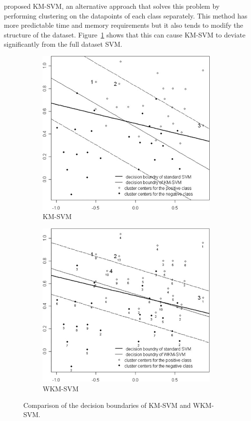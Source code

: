 \citet{Lee2007} proposed KM-SVM, an alternative approach that solves this problem by performing clustering on the datapoints of each class separately.
This method has more predictable time and memory requirements but it also tends to modify the structure of the dataset.
Figure~\ref{fig:wkmsvm:compare:km} shows that this can cause KM-SVM to deviate significantly from the full dataset SVM.\
\begin{figure}
	\begin{subfigure}{0.5\textwidth}
		\centering
		\includegraphics[width=0.85\linewidth]{gfx/wkmsvm/km.png}
		\caption{KM-SVM}\label{fig:wkmsvm:compare:km}
	\end{subfigure}
	\begin{subfigure}{0.5\textwidth}
		\centering
		\includegraphics[width=0.85\linewidth]{gfx/wkmsvm/wkm.png}
		\caption{WKM-SVM}\label{fig:wkmsvm:compare:wkm}
	\end{subfigure}
	\caption{Comparison of the decision boundaries of KM-SVM and WKM-SVM.\\ }\label{fig:wkmsvm:compare}
\end{figure}

